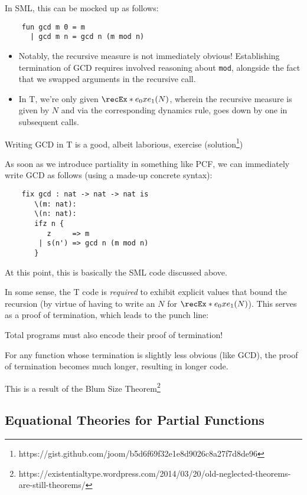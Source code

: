 \documentclass[letterpaper]{article}
\begin{document}
In SML, this can be mocked up as follows:
\begin{verbatim}
    fun gcd m 0 = m
      | gcd m n = gcd n (m mod n)
\end{verbatim}
\begin{itemize}
    \item Notably, the recursive measure is not immediately obvious! Establishing termination of GCD requires involved reasoning about \verb|mod|, alongside the fact that we swapped arguments in the recursive call.
    \item In T, we're only given $\recEx*{e_0}{x}{e_1}(N)$, wherein the recursive measure is given by $N$ and via the corresponding dynamics rule, goes down by one in subsequent calls.
\end{itemize}
Writing GCD in T is a good, albeit laborious, exercise (solution\footnote{https://gist.github.com/joom/b5d6f69f32e1e8d9026c8a27f7d8de96})

As soon as we introduce partiality in something like PCF, we can immediately write GCD as follows (using a made-up concrete syntax):

\begin{verbatim}
    fix gcd : nat -> nat -> nat is
       \(m: nat): 
       \(n: nat):
       ifz n {
          z     => m
        | s(n') => gcd n (m mod n)
       }
\end{verbatim}

At this point, this is basically the SML code discussed above.

In some sense, the T code is \textit{required} to exhibit explicit values that bound the recursion (by virtue of having to write an $N$ for $\recEx*{e_0}{x}{e_1}(N)$). This serves as a proof of termination, which leads to the punch line:

\begin{center}
    Total programs must also encode their proof of termination!
\end{center}

For any function whose termination is slightly less obvious (like GCD), the proof of termination becomes much longer, resulting in longer code.

This is a result of the Blum Size Theorem\footnote{https://existentialtype.wordpress.com/2014/03/20/old-neglected-theorems-are-still-theorems/}

\subsection{Equational Theories for Partial Functions}
\end{document}
